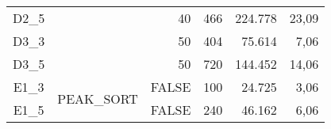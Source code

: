 \begin{table}[]
\begin{tabular}{@{}ccrrrr@{}}
D2\_5          &                                           & 40                        & 466                          & 224.778                          & 23,09                               \\
D3\_3          &                                           & 50                        & 404                          & 75.614                           & 7,06                                \\
D3\_5          &                                           & 50                        & 720                          & 144.452                          & 14,06                               \\
\midrule
E1\_3          & \multirow{2}{*}{PEAK\_SORT}               & FALSE                     & 100                          & 24.725                           & 3,06                                \\
E1\_5          &                                           & FALSE                     & 240                          & 46.162                           & 6,06                                \\
\midrule
\bottomrule
\end{tabular}
\end{table}





